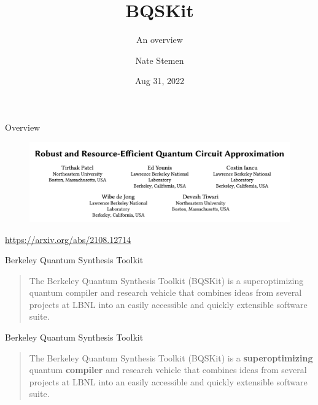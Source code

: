 \documentclass[11pt,aspectratio=1610,xcolor=dvipsnames]{beamer}
\title{BQSKit}
\subtitle{An overview}
\date{Aug 31, 2022}
\author{Nate Stemen}
\institute{Unitary Fund}
\begin{document}
\maketitle

\begin{frame}{Overview}
	\begin{figure}[h]
		\centering
		\includegraphics[width=\textwidth]{paper.png}
	\end{figure}
	\begin{center}
		\url{https://arxiv.org/abs/2108.12714}
	\end{center}
\end{frame}

\begin{frame}{Berkeley Quantum Synthesis Toolkit}
	\begin{quote}
		The Berkeley Quantum Synthesis Toolkit (BQSKit) is a superoptimizing quantum compiler and research vehicle that combines ideas from several projects at LBNL into an easily accessible and quickly extensible software suite.
	\end{quote}
\end{frame}

\begin{frame}{Berkeley Quantum Synthesis Toolkit}
	\begin{quote}
		The Berkeley Quantum Synthesis Toolkit (BQSKit) is a \textbf{superoptimizing} quantum \textbf{compiler} and research vehicle that combines ideas from several projects at LBNL into an easily accessible and quickly extensible software suite.
	\end{quote}
\end{frame}
\end{document}
